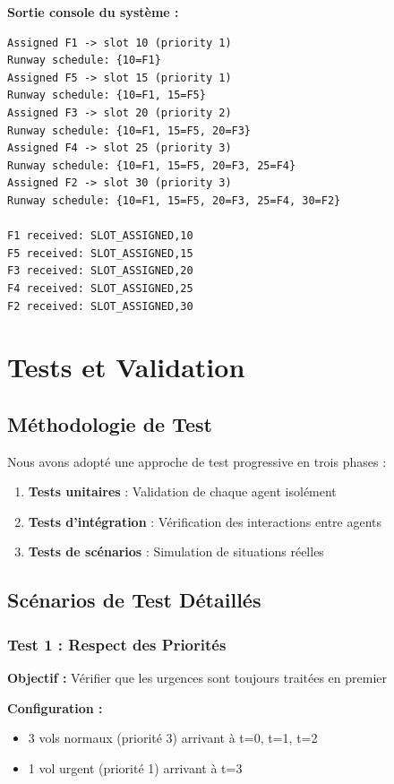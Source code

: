 \documentclass[12pt,a4paper]{article}
\begin{document}
\textbf{Sortie console du système :}

\begin{verbatim}
Assigned F1 -> slot 10 (priority 1)
Runway schedule: {10=F1}
Assigned F5 -> slot 15 (priority 1)
Runway schedule: {10=F1, 15=F5}
Assigned F3 -> slot 20 (priority 2)
Runway schedule: {10=F1, 15=F5, 20=F3}
Assigned F4 -> slot 25 (priority 3)
Runway schedule: {10=F1, 15=F5, 20=F3, 25=F4}
Assigned F2 -> slot 30 (priority 3)
Runway schedule: {10=F1, 15=F5, 20=F3, 25=F4, 30=F2}

F1 received: SLOT_ASSIGNED,10
F5 received: SLOT_ASSIGNED,15
F3 received: SLOT_ASSIGNED,20
F4 received: SLOT_ASSIGNED,25
F2 received: SLOT_ASSIGNED,30
\end{verbatim}

\section{Tests et Validation}

\subsection{Méthodologie de Test}

Nous avons adopté une approche de test progressive en trois phases :

\begin{enumerate}[leftmargin=*, label=\textcolor{primaryblue}{\textbf{Phase \arabic*:}}]
    \item \textbf{Tests unitaires} : Validation de chaque agent isolément
    \item \textbf{Tests d'intégration} : Vérification des interactions entre agents
    \item \textbf{Tests de scénarios} : Simulation de situations réelles
\end{enumerate}

\subsection{Scénarios de Test Détaillés}

\subsubsection{Test 1 : Respect des Priorités}

\textbf{Objectif :} Vérifier que les urgences sont toujours traitées en premier

\textbf{Configuration :}
\begin{itemize}
    \item 3 vols normaux (priorité 3) arrivant à t=0, t=1, t=2
    \item 1 vol urgent (priorité 1) arrivant à t=3
\end{itemize}
\end{document}
